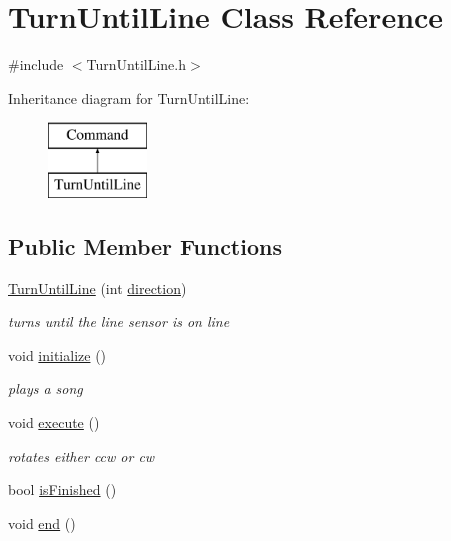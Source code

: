 \hypertarget{classTurnUntilLine}{\section{Turn\-Until\-Line Class Reference}
\label{classTurnUntilLine}
}


{\ttfamily \#include $<$Turn\-Until\-Line.\-h$>$}

Inheritance diagram for Turn\-Until\-Line\-:\begin{figure}[H]
\begin{center}
\leavevmode
\includegraphics[height=2.000000cm]{classTurnUntilLine}
\end{center}
\end{figure}
\subsection*{Public Member Functions}
\begin{DoxyCompactItemize}
\item 
\hyperlink{classTurnUntilLine_a737bfe72e0d4dbcce9f91182e319d28d}{Turn\-Until\-Line} (int \hyperlink{classTurnUntilLine_ac7e62d06dece2d456f9ea6e987b480cf}{direction})
\begin{DoxyCompactList}\small\item\em turns until the line sensor is on line \end{DoxyCompactList}\item 
void \hyperlink{classTurnUntilLine_a99e42f7512b95097df29633877e72cbd}{initialize} ()
\begin{DoxyCompactList}\small\item\em plays a song \end{DoxyCompactList}\item 
void \hyperlink{classTurnUntilLine_a90feb7840ebc51984e4d0a31383ec5a9}{execute} ()
\begin{DoxyCompactList}\small\item\em rotates either ccw or cw \end{DoxyCompactList}\item 
bool \hyperlink{classTurnUntilLine_ad9232508d735c78d6443958fe2f18002}{is\-Finished} ()
\item 
void \hyperlink{classTurnUntilLine_a769864873e706e0ca6701eac7f947ede}{end} ()
\end{DoxyCompactItemize}
